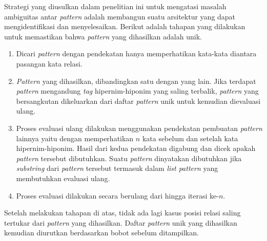 Strategi yang diusulkan dalam penelitian ini untuk mengatasi masalah ambiguitas antar \textit{pattern} adalah membangun suatu arsitektur yang dapat mengidentifikasi dan menyelesaikan. Berikut adalah tahapan yang dilakukan untuk memastikan bahwa \textit{pattern} yang dihasilkan adalah unik.

\begin{enumerate}
  \item Dicari \textit{pattern} dengan pendekatan hanya memperhatikan kata-kata diantara pasangan kata relasi.
  \item \textit{Pattern} yang dihasilkan, dibandingkan satu dengan yang lain. Jika terdapat \textit{pattern} mengandung \textit{tag} hipernim-hiponim yang saling terbalik, \textit{pattern} yang bersangkutan dikeluarkan dari daftar \textit{pattern} unik untuk kemudian dievaluasi ulang.
  \item Proses evaluasi ulang dilakukan menggunakan pendekatan pembuatan \textit{pattern} lainnya yaitu dengan memperhatikan $n$ kata sebelum dan setelah kata hipernim-hiponim. Hasil dari kedua pendekatan digabung dan dicek apakah \textit{pattern} tersebut dibutuhkan. Suatu \textit{pattern} dinyatakan dibutuhkan jika \textit{substring} dari \textit{pattern} tersebut termasuk dalam \textit{list pattern} yang membutuhkan evaluasi ulang.
  \item Proses evaluasi dilakukan secara berulang dari hingga iterasi ke-$n$.
\end{enumerate}

\noindent Setelah melakukan tahapan di atas, tidak ada lagi kasus posisi relasi saling tertukar dari \textit{pattern} yang dihasilkan. Daftar \textit{pattern} unik yang dihasilkan kemudian diurutkan berdasarkan bobot sebelum ditampilkan.
%


